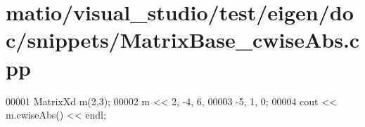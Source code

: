 \hypertarget{matio_2visual__studio_2test_2eigen_2doc_2snippets_2_matrix_base__cwise_abs_8cpp_source}{}\section{matio/visual\+\_\+studio/test/eigen/doc/snippets/\+Matrix\+Base\+\_\+cwise\+Abs.cpp}
\label{matio_2visual__studio_2test_2eigen_2doc_2snippets_2_matrix_base__cwise_abs_8cpp_source}

\begin{DoxyCode}
00001 MatrixXd m(2,3);
00002 m << 2, -4, 6,   
00003      -5, 1, 0;
00004 cout << m.cwiseAbs() << endl;
\end{DoxyCode}
